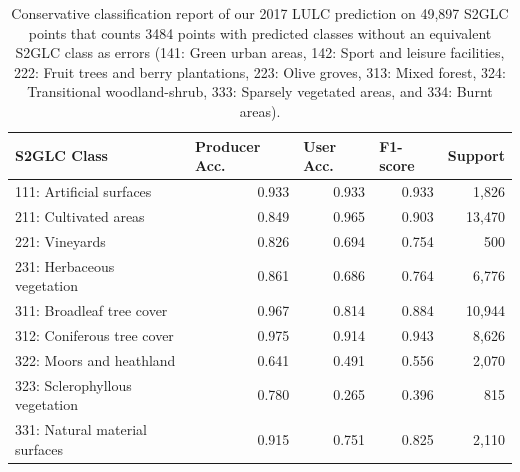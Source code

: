         \begin{table}[!hbt]
        \centering
        \caption{Conservative classification report of our 2017 LULC prediction on 49,897 S2GLC points that counts 3484 points with predicted classes without an equivalent S2GLC class as errors (141: Green urban areas, 142: Sport and leisure facilities, 222: Fruit trees and berry plantations, 223: Olive groves, 313: Mixed forest, 324: Transitional woodland-shrub, 333: Sparsely vegetated areas, and 334: Burnt areas).}
        \label{tab:classification_report_s2glc_conservative}
        \begin{tabular}{@{}lrrrr@{}}
        \toprule
        S2GLC Class                      & \multicolumn{1}{l}{Producer Acc.} & \multicolumn{1}{l}{User Acc.} & \multicolumn{1}{l}{F1-score} & \multicolumn{1}{l}{Support} \\ 
        \midrule
        111: Artificial surfaces       & 0.933                             & 0.933                         & 0.933                        & 1,826                    \\
        211: Cultivated areas          & 0.849                             & 0.965                         & 0.903                        & 13,470                   \\
        221: Vineyards                 & 0.826                             & 0.694                         & 0.754                        & 500                     \\
        231: Herbaceous vegetation     & 0.861                             & 0.686                         & 0.764                        & 6,776                    \\
        311: Broadleaf tree cover      & 0.967                             & 0.814                         & 0.884                        & 10,944                   \\
        312: Coniferous tree cover     & 0.975                             & 0.914                         & 0.943                        & 8,626                    \\
        322: Moors and heathland       & 0.641                             & 0.491                         & 0.556                        & 2,070                    \\
        323: Sclerophyllous vegetation & 0.780                             & 0.265                         & 0.396                        & 815                     \\
        331: Natural material surfaces & 0.915                             & 0.751                         & 0.825                        & 2,110                    \\

\end{tabular}
\end{table}
